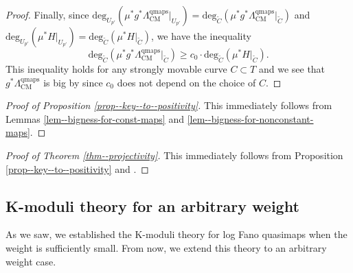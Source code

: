 \documentclass[12pt,twoside]{amsart}
\theoremstyle{definition}
\begin{document}
\begin{proof}
Finally, since $\mathrm{deg}_{U_{p'}}(\mu^*g^*\Lambda^{\mathrm{qmaps}}_{\mathrm{CM}}|_{U_{p'}})=\mathrm{deg}_{\tilde{C}}(\mu^*g^*\Lambda^{\mathrm{qmaps}}_{\mathrm{CM}}|_{\tilde{C}})$ and $\mathrm{deg}_{U_{p'}}(\mu^*H|_{U_{p'}})=\mathrm{deg}_{\tilde{C}}(\mu^*H|_{\tilde{C}})$, we have the inequality
\[
\mathrm{deg}_{\tilde{C}}(\mu^*g^*\Lambda^{\mathrm{qmaps}}_{\mathrm{CM}}|_{\tilde{C}})\ge c_0\cdot \mathrm{deg}_{\tilde{C}}(\mu^*H|_{\tilde{C}}).
\]
This inequality holds for any strongly movable curve $C\subset T$ and we see that $g^*\Lambda^{\mathrm{qmaps}}_{\mathrm{CM}}$ is big by \cite[Theorem 2.2]{BDPP} since $c_0$ does not depend on the choice of $C$.
\end{proof}

\begin{proof}[Proof of Proposition \ref{prop--key--to--positivity}]
    This immediately follows from Lemmas \ref{lem--bigness-for-const-maps} and \ref{lem--bigness-for-nonconstant-maps}.
\end{proof}

\begin{proof}[Proof of Theorem \ref{thm--projectivity}]
    This immediately follows from Proposition \ref{prop--key--to--positivity} and \cite[Theorem 3.11]{kollar-moduli-stable-surface-proj}.
\end{proof}
\subsection{K-moduli theory for an arbitrary weight}
As we saw, we established the K-moduli theory for log Fano quasimaps when the weight is sufficiently small.
From now, we extend this theory to an arbitrary weight case.
\end{document}
